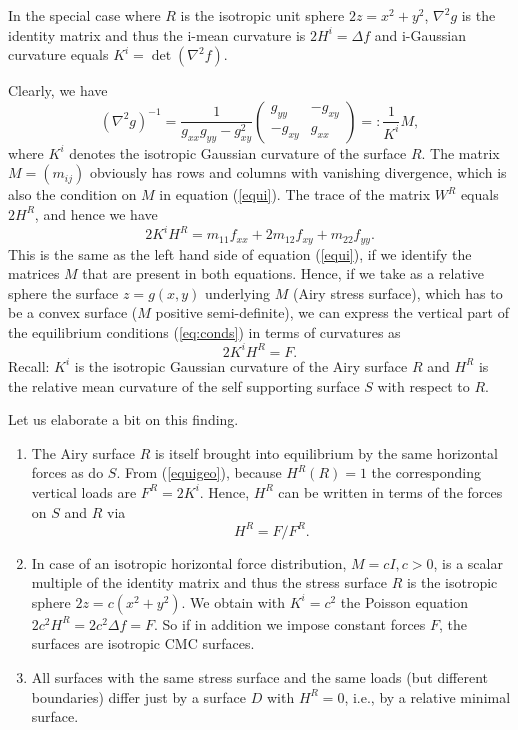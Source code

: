 \documentclass[annual]{acmsiggraph}
\def\be{\begin{equation}}
\def\ee{\end{equation}}
\begin{document}
In the special case where $R$ is the isotropic unit sphere $2z=x^2+y^2$, $\nabla^2 g$ is the identity
matrix and thus the i-mean curvature is  $2H^i =\Delta f$ and i-Gaussian curvature equals $K^i=\det(\nabla^2 f)$.

Clearly, we have
%
\be ( \nabla^2 g)^{-1}={ \frac{1}{g_{xx}g_{yy}-g_{xy}^2}}\left( \begin{array}{cc} g_{yy} & -g_{xy} \\ -g_{xy} & g_{xx} \end{array} \right)=:{\frac{1}{K^i}}M, \ee
%
where $K^i$ denotes the isotropic Gaussian curvature of the surface $R$. 
The matrix $M=(m_{ij})$ obviously has rows and columns with vanishing divergence, which is also the
 condition on
$M$ in equation (\ref{equi}). 
The trace of the matrix $W^R$ equals $2H^R$, and hence we have
%
$$ 2 K^i H^R  = m_{11}f_{xx}+2m_{12}f_{xy}+m_{22}f_{yy}. $$
%
This is the same as the left hand side of equation (\ref{equi}), if we identify the
matrices $M$ that are present in both equations. Hence, if we take as a 
relative sphere the surface $z=g(x,y)$ underlying $M$ (Airy stress surface), which has to be
a convex surface ($M$ positive semi-definite), we can express the vertical part of the equilibrium
conditions (\ref{eq:conds}) in terms of curvatures as
%
\be 2 K^i H^R = F. \label{equigeo} \ee
%
Recall: $K^i$ is the isotropic Gaussian curvature of the Airy surface $R$ and $H^R$ is the relative mean
curvature of the self supporting surface $S$ with respect to $R$. 

Let us elaborate a bit on this finding.

\begin{enumerate}
\item The Airy surface $R$ is itself brought into equilibrium by the same horizontal
forces as do $S$. From (\ref{equigeo}), because $H^R(R)=1$ the corresponding vertical loads are $F^R=2K^i$. Hence, $H^R$ can
be written in terms of the forces on $S$ and $R$ via
%
\be H^R = F/F^R. \label{equigeo2} \ee
%
\item In case of an isotropic horizontal force distribution, $M=cI, c>0$, is a scalar multiple of the identity matrix and thus the stress surface 
$R$ is the isotropic sphere $2z=c(x^2+y^2)$. We obtain with $K^i=c^2$ the Poisson equation 
$2c^2 H^R = 2 c^2 \Delta f = F$. So if in addition we impose constant forces $F$, the surfaces
are isotropic CMC surfaces.

\item All surfaces with the same stress surface and the same loads
(but different boundaries) differ just by a surface $D$ with $H^R=0$, i.e., by a relative minimal surface. 
\end{enumerate} 
\end{document}

